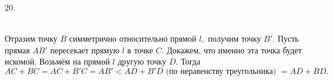 20. \begin{figure}[ht!]
\end{figure}\\
Отразим точку $B$ симметрично относительно прямой $l,$ получим точку $B'.$ Пусть прямая $AB'$ пересекает прямую $l$ в точке $C.$ Докажем, что именно эта точка будет искомой. Возьмём на прямой $l$ другую точку $D.$ Тогда $AC+BC=AC+B'C=AB'<AD+B'D\text{ (по неравенству треугольника) }=AD+BD.$\newpage\noindent
